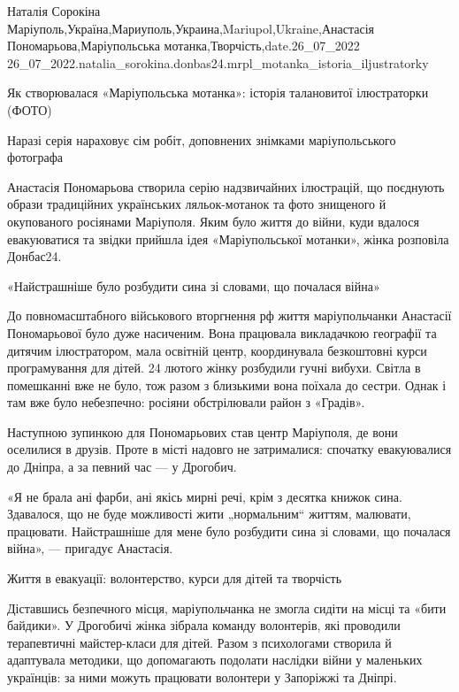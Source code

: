  
 
 
 
 

Наталія Сорокіна
Маріуполь,Україна,Мариуполь,Украина,Mariupol,Ukraine,Анастасія Пономарьова,Маріупольська мотанка,Творчість,date.26_07_2022
26_07_2022.natalia_sorokina.donbas24.mrpl_motanka_istoria_iljustratorky

Як створювалася «Маріупольська мотанка»: історія талановитої ілюстраторки
(ФОТО)

Наразі серія нараховує сім робіт, доповнених знімками маріупольського фотографа

Анастасія Пономарьова створила серію надзвичайних ілюстрацій, що поєднують
образи традиційних українських ляльок-мотанок та фото знищеного й окупованого
росіянами Маріуполя. Яким було життя до війни, куди вдалося евакуюватися та
звідки прийшла ідея «Маріупольської мотанки», жінка розповіла Донбас24.

«Найстрашніше було розбудити сина зі словами, що почалася війна»

До повномасштабного військового вторгнення рф життя маріупольчанки Анастасії
Пономарьової було дуже насиченим. Вона працювала викладачкою географії та
дитячим ілюстратором, мала освітній центр, координувала безкоштовні курси
програмування для дітей. 24 лютого жінку розбудили гучні вибухи. Світла в
помешканні вже не було, тож разом з близькими вона поїхала до сестри. Однак і
там вже було небезпечно: росіяни обстрілювали район з «Градів».

Наступною зупинкою для Пономарьових став центр Маріуполя, де вони оселилися в
друзів. Проте в місті надовго не затрималися: спочатку евакуювалися до Дніпра,
а за певний час — у Дрогобич.

«Я не брала ані фарби, ані якісь мирні речі, крім з десятка книжок сина.
Здавалося, що не буде можливості жити „нормальним“ життям, малювати, працювати.
Найстрашніше для мене було розбудити сина зі словами, що почалася війна», —
пригадує Анастасія.  

Життя в евакуації: волонтерство, курси для дітей та творчість

Діставшись безпечного місця, маріупольчанка не змогла сидіти на місці та «бити
байдики». У Дрогобичі жінка зібрала команду волонтерів, які проводили
терапевтичні майстер-класи для дітей. Разом з психологами створила й адаптувала
методики, що допомагають подолати наслідки війни у маленьких українців: за ними
можуть працювати волонтери у Запоріжжі та Дніпрі.

